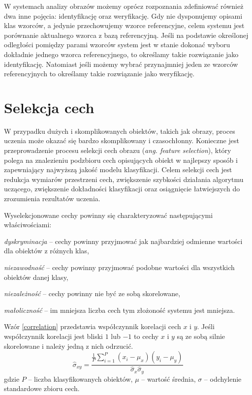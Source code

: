 W systemach analizy obrazów możemy oprócz rozpoznania zdefiniować również dwa inne pojęcia: identyfikację oraz weryfikację. Gdy nie dysponujemy opisami klas wzorców, a jedynie przechowujemy wzorce referencyjne, celem systemu jest porównanie aktualnego wzorca z bazą referencyjną. Jeśli na podstawie określonej odległości pomiędzy parami wzorców system jest w stanie dokonać wyboru dokładnie jednego wzorca referencyjnego, to określamy takie rozwiązanie jako identyfikację. Natomiast jeśli możemy wybrać przynajmniej jeden ze wzorców referencyjnych to określamy takie rozwiązanie jako weryfikację.

\section{Selekcja cech}


W przypadku dużych i skomplikowanych obiektów, takich jak obrazy, proces uczenia może okazać się bardzo skomplikowany i czasochłonny. Konieczne jest przeprowadzenie procesu selekcji cech obrazu (\emph{ang. feature selection}), który polega na znalezieniu podzbioru cech opisujących obiekt w najlepszy sposób i zapewniający najwyższą jakość modelu klasyfikacji. Celem selekcji cech jest redukcja wymiarów przestrzeni cech, zwiększenie szybkości działania algorytmu uczącego, zwiększenie dokładności klasyfikacji oraz osiągnięcie łatwiejszych do zrozumienia rezultatów uczenia.\cite{MOTODA98}

Wyselekcjonowane cechy powinny się charakteryzować następującymi właściwościami\cite{STRUMIL}:

\begin{compactitem}
	\item \emph{dyskryminacja} -- cechy powinny przyjmować jak najbardziej odmienne wartości dla obiektów z różnych klas,
	\item \emph{niezawodność} -- cechy powinny przyjmować podobne wartości dla wszystkich obiektów danej klasy,
	\item \emph{niezależność} -- cechy powinny nie być ze sobą skorelowane,
	\item \emph{małoliczność} -- im mniejsza liczba cech tym złożoność systemu jest mniejsza.
\end{compactitem}

Wzór \ref{correlation} przedstawia współczynnik korelacji cech $x$ i $y$. Jeśli współczynnik korelacji jest bliski $1$ lub $-1$ to cechy $x$ i $y$ są ze sobą silnie skorelowane i należy jedną z nich odrzucić.
\begin{equation} 
\label{correlation} 
\hat{\sigma}_{xy}= \frac{\frac{1}{P}\sum\limits_{i=1}^P(x_i-\mu_x)(y_i-\mu_y)}{ \hat{\sigma}_x\hat{\sigma}_y }
\end{equation} gdzie $P$ -- liczba klasyfikowanych obiektów, $\mu$ -- wartość średnia, $\sigma$ -- odchylenie standardowe zbioru cech.

